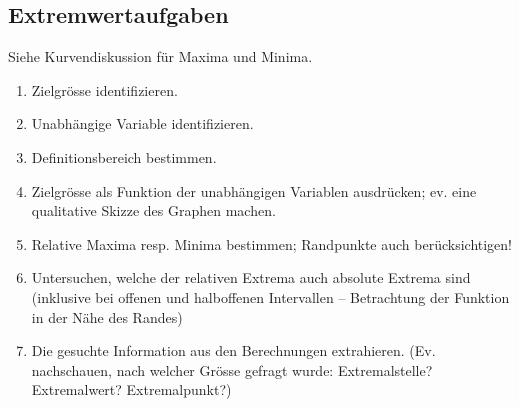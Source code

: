 \subsection{Extremwertaufgaben}
Siehe Kurvendiskussion für Maxima und Minima.\\
\begin{enumerate}
	\item Zielgrösse identifizieren.
	\item Unabhängige Variable identifizieren.
	\item Definitionsbereich bestimmen.
	\item Zielgrösse als Funktion der unabhängigen Variablen ausdrücken; ev. eine qualitative Skizze des Graphen machen.
	\item Relative Maxima resp. Minima bestimmen; Randpunkte auch berücksichtigen!
	\item Untersuchen, welche der relativen Extrema auch absolute Extrema sind (inklusive bei offenen und halboffenen Intervallen – Betrachtung der Funktion in der Nähe des Randes)
	\item Die gesuchte Information aus den Berechnungen extrahieren. (Ev. nachschauen, nach welcher Grösse gefragt wurde: Extremalstelle? Extremalwert? Extremalpunkt?)
\end{enumerate}